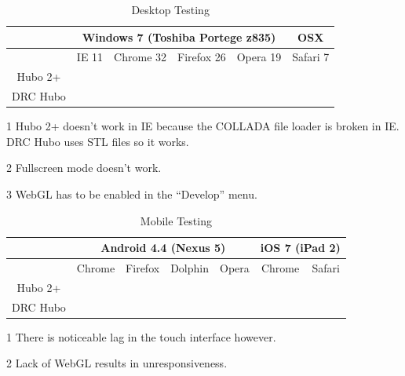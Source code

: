 \documentclass[letterpaper, 10 pt, conference]{ieee/ieeeconf}  %
\newcommand{\cmark}{\ding{51}}%
\newcommand{\xmark}{\ding{55}}%
\begin{document}
\begin{table}[h]
\begin{center}
\begin{threeparttable}[b]
\caption{Desktop Testing}
\label{tab:DesktopTesting}
\begin{tabular}{|c|c|c|c|c|c|}
\hline         & \multicolumn{4}{|c|}{Windows 7 (Toshiba Portege z835)} & \multicolumn{1}{|c|}{OSX} \\ 
\hline          & IE 11            & Chrome 32 & Firefox 26 & Opera 19 & Safari 7 \\ 
\hline Hubo 2+  & \xmark \tnote{1} & \cmark    & \cmark     & \cmark   & \cmark  \tnote{2} \tnote{,3} \\ 
\hline DRC Hubo & \cmark \tnote{2} & \cmark    & \cmark     & \cmark   & \cmark  \tnote{2} \tnote{,3} \\ 
\hline 
\end{tabular} 
\begin{tablenotes}
\item [1] Hubo 2+ doesn't work in IE because the COLLADA file loader is broken in IE. DRC Hubo uses STL files so it works.
\item [2] Fullscreen mode doesn't work.
\item [3] WebGL has to be enabled in the ``Develop'' menu.
\end{tablenotes}
\end{threeparttable}
\end{center}
\end{table}
\begin{table}[h]
\begin{center}
\begin{threeparttable}[b]
\caption{Mobile Testing}
\label{tab:MobileTesting}
\begin{tabular}{|c|c|c|c|c|c|c|}
\hline         & \multicolumn{4}{|c|}{Android 4.4 (Nexus 5)} & \multicolumn{2}{|c|}{iOS 7 (iPad 2)} \\ 
\hline         & Chrome & Firefox          & Dolphin          & Opera  & Chrome           & Safari \\ 
\hline Hubo 2+ & \cmark & \cmark \tnote{1} & \xmark \tnote{2} & \cmark & \xmark \tnote{2} & \xmark \tnote{2} \\ 
\hline DRC Hubo& \cmark & \cmark \tnote{1} & \xmark \tnote{2} & \cmark & \xmark \tnote{2} & \xmark \tnote{2} \\ 
\hline 
\end{tabular} 
\begin{tablenotes}
\item [1] There is noticeable lag in the touch interface however.
\item [2] Lack of WebGL results in unresponsiveness.
\end{tablenotes}
\end{threeparttable}
\end{center}
\end{table}
\end{document}
